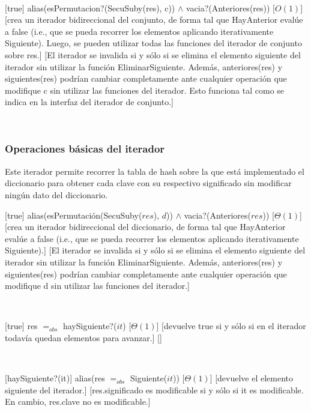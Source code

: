 ~

[true]
{alias(esPermutacion?(SecuSuby(res), c)) $\land$ vacia?(Anteriores(res))}
[$O(1)$]
[crea un iterador bidireccional del conjunto, de forma tal que HayAnterior evalúe a false (i.e.,
que se pueda recorrer los elementos aplicando iterativamente Siguiente). Luego, se pueden utilizar
todas las funciones del iterador de conjunto sobre res.]
[El iterador se invalida si y sólo si se elimina el elemento siguiente del iterador sin utilizar la función
EliminarSiguiente. Además, anteriores(res) y siguientes(res) podrían cambiar completamente ante cualquier
operación que modifique c sin utilizar las funciones del iterador. Esto funciona tal como se indica en la interfaz del iterador de conjunto.]

~

\subsubsection{Operaciones básicas del iterador}

Este iterador permite recorrer la tabla de hash sobre la que est\'{a} implementado el diccionario para obtener cada clave con su respectivo significado sin modificar ning\'{u}n dato del diccionario.

[true]
{alias(esPermutación(SecuSuby($res$), $d$)) $\land$ vacia?(Anteriores($res$))}
[$\Theta(1)$]
[crea un iterador bidireccional del diccionario, de forma tal que HayAnterior evalúe a false (i.e.,
que se pueda recorrer los elementos aplicando iterativamente Siguiente).]
[El iterador se invalida si y sólo si se elimina el elemento siguiente del iterador sin utilizar la función
EliminarSiguiente. Además, anteriores(res) y siguientes(res) podrían cambiar completamente ante cualquier
operación que modifique d sin utilizar las funciones del iterador.]

~

[true]
{res $=_{obs}$ haySiguiente?($it$)}
[$\Theta(1)$]
[devuelve true si y sólo si en el iterador todavía quedan elementos para avanzar.]
[]

~

[haySiguiente?(it)]
{alias(res $=_{obs}$ Siguiente($it$))}
[$\Theta(1)$]
[devuelve el elemento siguiente del iterador.]
[res.significado es modificable si y sólo si it es modificable. En cambio, res.clave no es modificable.]

